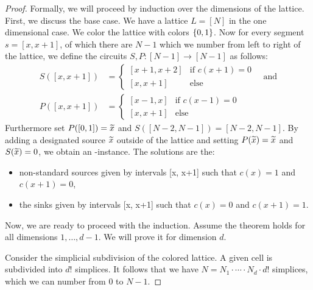 \begin{proof}
	Formally, we will proceed by induction over the dimensions of the lattice. First, we discuss the base case. We have a lattice $L = [N]$ in the one dimensional case. We color the lattice with colors $\left\{0, 1\right\}$. Now for every segment $s = [x, x+1]$, of which there are $N-1$ which we number from left to right of the lattice, we define the circuits $S, P : [N-1] \rightarrow [N-1]$ as follows:
	\begin{align*}
		S([x, x+1]) & = \begin{cases}
			                [x + 1, x+2] & \text{if $c(x+1) = 0$} \\
			                [x, x+1]     & \text{else}
		                \end{cases} \quad \text{and} \\
		P([x, x+1]) & = \begin{cases}
			                [x - 1, x] & \text{if $c(x-1) = 0$} \\
			                [x, x+1]   & \text{else}
		                \end{cases}
	\end{align*}
	Furthermore set $P([0, 1]) = \widetilde{x}$ and $S([N-2, N-1]) = [N-2, N-1]$. By adding a designated source $\widetilde{x}$ outside of the lattice and setting $P(\widetilde{x}) = \widetilde{x}$ and $S(\widetilde{x}) = 0$, we obtain an \EndOfLine-instance. The solutions are the:
	\begin{itemize}
		\item non-standard sources given by intervals [x, x+1] such that $c(x) = 1$ and $c(x+1) = 0$,
		\item the sinks given by intervals [x, x+1] such that $c(x) = 0$ and $c(x+1) = 1$.
	\end{itemize}
	Now, we are ready to proceed with the induction. Assume the theorem holds for all dimensions $1, \dots, d-1$. We will prove it for dimension $d$.

	Consider the simplicial subdivision of the colored lattice. A given cell is subdivided into ${d!}$ simplices. It follows that we have $N = N_1 \cdot \cdots \cdot N_d \cdot {d!}$ simplices, which we can number from $0$ to $N-1$.


\end{proof}
